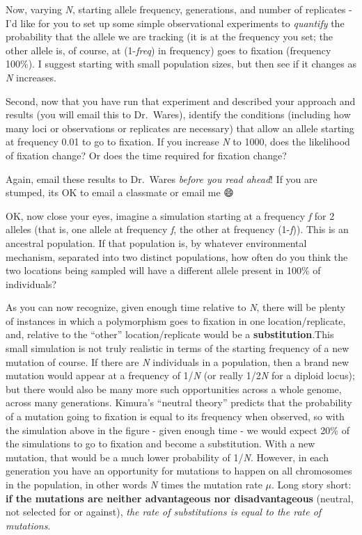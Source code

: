 \documentclass[
]{article}
\begin{document}
Now, varying \emph{N}, starting allele frequency, generations, and
number of replicates - I'd like for you to set up some simple
observational experiments to \emph{quantify} the probability that the
allele we are tracking (it is at the frequency you set; the other allele
is, of course, at (1-\emph{freq}) in frequency) goes to fixation
(frequency 100\%). I suggest starting with small population sizes, but
then see if it changes as \emph{N} increases.

Second, now that you have run that experiment and described your
approach and results (you will email this to Dr.~Wares), identify the
conditions (including how many loci or observations or replicates are
necessary) that allow an allele starting at frequency 0.01 to go to
fixation. If you increase \emph{N} to 1000, does the likelihood of
fixation change? Or does the time required for fixation change?

Again, email these results to Dr.~Wares \emph{before you read ahead}! If
you are stumped, its OK to email a classmate or email me 😄

OK, now close your eyes, imagine a simulation starting at a frequency
\emph{f} for 2 alleles (that is, one allele at frequency \emph{f}, the
other at frequency (1-\emph{f})). This is an ancestral population. If
that population is, by whatever environmental mechanism, separated into
two distinct populations, how often do you think the two locations being
sampled will have a different allele present in 100\% of individuals?

As you can now recognize, given enough time relative to \emph{N}, there
will be plenty of instances in which a polymorphism goes to fixation in
one location/replicate, and, relative to the ``other''
location/replicate would be a \textbf{substitution}.This small
simulation is not truly realistic in terms of the starting frequency of
a new mutation of course. If there are \emph{N} individuals in a
population, then a brand new mutation would appear at a frequency of
1/\emph{N} (or really 1/2\emph{N} for a diploid locus); but there would
also be many more such opportunities across a whole genome, across many
generations. Kimura's ``neutral theory'' predicts that the probability
of a mutation going to fixation is equal to its frequency when observed,
so with the simulation above in the figure - given enough time - we
would expect 20\% of the simulations to go to fixation and become a
substitution. With a new mutation, that would be a much lower
probability of 1/\emph{N}. However, in each generation you have an
opportunity for mutations to happen on all chromosomes in the
population, in other words \emph{N} times the mutation rate \(\mu\).
Long story short: \textbf{if the mutations are neither advantageous nor
disadvantageous} (neutral, not selected for or against), \emph{the rate
of substitutions is equal to the rate of mutations}.
\end{document}
